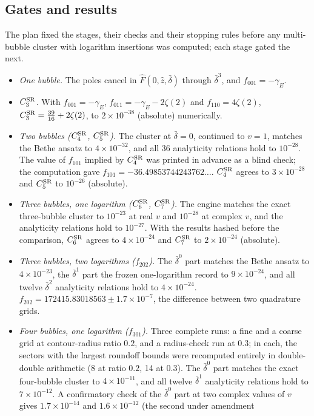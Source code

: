 \documentclass[11pt,a4paper]{article}
\numberwithin{equation}{section}
\newcommand{\CSR}{C^{\rm SR}}
\newcommand{\db}{\bar\delta}
\newcommand{\sci}[2]{#1\times10^{#2}}
\begin{document}
\subsection{Gates and results}\label{app:integ:gates}
The plan fixed the stages, their checks and their stopping rules before any multi-bubble cluster with logarithm
insertions was computed; each stage gated the
next.
\begin{itemize}
\item \emph{One bubble.} The poles cancel in $\hat F(0,\hat z,\db)$ through $\db^3$, and $f_{001}=-\gamma_E$.
\item \emph{$\CSR_3$.} With $f_{001}=-\gamma_E$, $f_{011}=-\gamma_E-2\zeta(2)$ and $f_{110}=4\zeta(2)$,
 $\CSR_3=\frac{39}{16}+2\zeta(2)$, to $\sci{2}{-38}$ (absolute) numerically.
\item \emph{Two bubbles ($\CSR_4$, $\CSR_5$).} The cluster at $\db=0$, continued to $v=1$, matches the Bethe ansatz to
 $\sci{4}{-32}$, and all 36 analyticity relations hold to $10^{-28}$. The value of $f_{101}$ implied by $\CSR_4$ was
 printed in advance as a blind check; the computation gave $f_{101}=-36.49853744243762\ldots$. $\CSR_4$ agrees to
 $\sci{3}{-28}$ and $\CSR_5$ to $10^{-26}$ (absolute).
\item \emph{Three bubbles, one logarithm ($\CSR_6$, $\CSR_7$).} The engine matches the exact three-bubble cluster to
 $10^{-23}$ at real $v$ and $10^{-28}$ at complex $v$, and the analyticity relations hold to $10^{-27}$. With the results
 hashed before the comparison, $\CSR_6$ agrees to $\sci{4}{-24}$ and $\CSR_7$ to $\sci{2}{-24}$ (absolute).
\item \emph{Three bubbles, two logarithms ($f_{202}$).} The $\db^0$ part matches the Bethe ansatz to $\sci{4}{-23}$, the
 $\db^1$ part the frozen one-logarithm record to $\sci{9}{-24}$, and all twelve $\db^2$ analyticity relations hold to
 $\sci{4}{-24}$. $f_{202}=172415.83018563\pm\sci{1.7}{-7}$, the difference between two quadrature grids.
\item \emph{Four bubbles, one logarithm ($f_{301}$).} Three complete runs: a fine and a coarse grid at contour-radius
 ratio $0.2$, and a radius-check run at $0.3$; in each, the sectors with the largest roundoff bounds were recomputed
 entirely in double-double arithmetic (8 at ratio $0.2$, 14 at $0.3$). The $\db^0$ part matches the exact four-bubble
 cluster to $\sci{4}{-11}$, and all twelve $\db^1$ analyticity relations hold to $\sci{7}{-12}$. A confirmatory check of
 the $\db^0$ part at two complex values of $v$ gives $\sci{1.7}{-14}$ and $\sci{1.6}{-12}$ (the second under amendment

\end{itemize}
\end{document}
